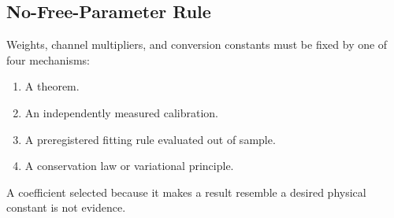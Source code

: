 \documentclass[12pt,oneside]{book}
\begin{document}
\subsection{No-Free-Parameter Rule}
Weights, channel multipliers, and conversion constants must be fixed by one of four mechanisms:
\begin{enumerate}[noitemsep]
\item A theorem.
\item An independently measured calibration.
\item A preregistered fitting rule evaluated out of sample.
\item A conservation law or variational principle.
\end{enumerate}
\noindent A coefficient selected because it makes a result resemble a desired physical constant is not evidence.

\end{document}
